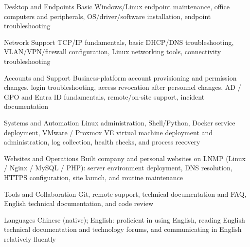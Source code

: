
\begin{cvskills}

  \cvskill
    {Desktop and Endpoints}
    {Basic Windows/Linux endpoint maintenance, office computers and peripherals, OS/driver/software installation, endpoint troubleshooting}

  \cvskill
    {Network Support}
    {TCP/IP fundamentals, basic DHCP/DNS troubleshooting, VLAN/VPN/firewall configuration, Linux networking tools, connectivity troubleshooting}

  \cvskill
    {Accounts and Support}
    {Business-platform account provisioning and permission changes, login troubleshooting, access revocation after personnel changes, AD / GPO and Entra ID fundamentals, remote/on-site support, incident documentation}

  \cvskill
    {Systems and Automation}
    {Linux administration, Shell/Python, Docker service deployment, VMware / Proxmox VE virtual machine deployment and administration, log collection, health checks, and process recovery}

  \cvskill
    {Websites and Operations}
    {Built company and personal websites on LNMP (Linux / Nginx / MySQL / PHP): server environment deployment, DNS resolution, HTTPS configuration, site launch, and routine maintenance}

  \cvskill
    {Tools and Collaboration}
    {Git, remote support, technical documentation and FAQ, English technical documentation, and code review}

  \cvskill
    {Languages}
    {Chinese (native); English: proficient in using English, reading English technical documentation and technology forums, and communicating in English relatively fluently}

\end{cvskills}
